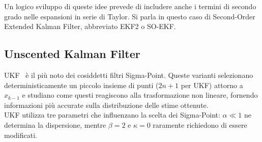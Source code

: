 \documentclass[12pt,a4paper,openright,twoside]{book}
\begin{document}
Un logico sviluppo di queste idee prevede di includere anche i termini di secondo grado nelle espansioni in serie di Taylor. Si parla in questo caso di Second-Order Extended Kalman Filter, abbreviato EKF2 o SO-EKF.

\subsection{Unscented Kalman Filter}

UKF~\cite{882463} è il più noto dei cosiddetti filtri Sigma-Point. Queste varianti selezionano deterministicamente un piccolo insieme di punti ($2n+1$ per UKF) attorno a $\hat{x}_{k-1}$ e studiano come questi reagiscono alla trasformazione non lineare, fornendo informazioni più accurate sulla distribuzione delle stime ottenute. \\

UKF utilizza tre parametri che influenzano la scelta dei Sigma-Point: $\alpha\ll1$ ne determina la dispersione, mentre $\beta=2$ e $\kappa=0$ raramente richiedono di essere modificati.
\end{document}

